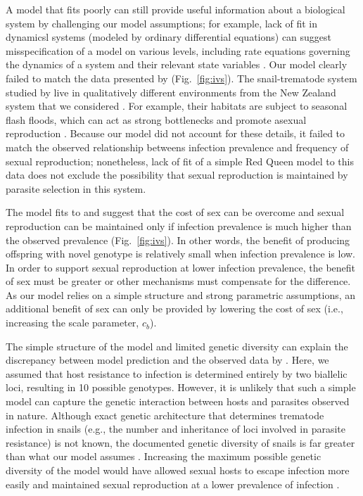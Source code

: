 \documentclass{article}\usepackage[]{graphicx}\usepackage[]{color}
\newcommand{\fref}[1]{Fig.~\ref{fig:#1}}
\begin{document}
A model that fits poorly can still provide useful information about a biological
system by challenging our model assumptions;
for example, lack of fit in dynamicsl systems (modeled by ordinary differential 
equations) can suggest misspecification of a model on various levels, including
rate equations governing the dynamics of a system and their relevant state variables
\citep{hooker2015goodness}.
Our model clearly failed to match the data presented by \cite{dagan2013clonal} (\fref{ivs}).
The snail-trematode system studied by \cite{dagan2013clonal} live in qualitatively different environments from the New Zealand system that we considered \citep{vergara2014infection, mckone2016fine}.
For example, their habitats are subject to seasonal flash floods, which can act as 
strong bottlenecks and promote asexual reproduction \citep{ben2007temporal}.
Because our model did not account for these details, it failed to match the observed 
relationship betweens infection prevalence and frequency of sexual reproduction;
nonetheless, lack of fit of a simple Red Queen model to this data does not exclude the 
possibility that sexual reproduction is maintained by parasite selection in this 
system.

The model fits to \cite{dagan2013clonal} and \cite{mckone2016fine} suggest that the cost of sex can be overcome and sexual reproduction can be maintained only if infection prevalence is much higher than the observed prevalence (\fref{ivs}).
In other words, the benefit of producing offspring with novel genotype is relatively small when infection prevalence is low.
In order to support sexual reproduction at lower infection prevalence, the benefit of sex must be greater or other mechanisms must compensate for the difference.
As our model relies on a simple structure and strong parametric assumptions, an additional benefit of sex can only be provided by lowering the cost of sex (i.e., increasing the scale parameter, $c_b$).

The simple structure of the model and limited genetic diversity can explain the discrepancy between model prediction and the observed data by \cite{mckone2016fine}.
Here, we assumed that host resistance to infection is determined entirely by two biallelic loci, resulting in 10 possible genotypes.
However, it is unlikely that such a simple model can capture the genetic interaction between hosts and parasites observed in nature.
Although exact genetic architecture that determines trematode infection in snails (e.g., the number and inheritance of loci involved in parasite resistance) is not known, the documented genetic diversity of snails is far greater than what our model assumes \citep{fox1996genetic, king2011parasites, dagan2013clonal}.
Increasing the maximum possible genetic diversity of the model would have allowed sexual hosts to escape infection more easily and maintained sexual reproduction at a lower prevalence of infection \citep{lively2010effect, king2012does, ashby2015diversity}.
\end{document}
